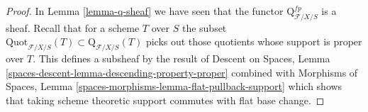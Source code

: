 \documentclass{stacks-project}
\theoremstyle{plain}
\theoremstyle{definition}
\theoremstyle{remark}
\numberwithin{equation}{subsection}
\def\Quotfunctor{\mathrm{Quot}}
\begin{document}
\begin{proof}
In Lemma \ref{lemma-q-sheaf} we have seen that the functor
$\text{Q}^{fp}_{\mathcal{F}/X/S}$ is a sheaf. Recall that for a
scheme $T$ over $S$ the subset
$\Quotfunctor_{\mathcal{F}/X/S}(T) \subset \text{Q}_{\mathcal{F}/X/S}(T)$
picks out those quotients whose support is proper over $T$.
This defines a subsheaf by the result of
Descent on Spaces, Lemma \ref{spaces-descent-lemma-descending-property-proper}
combined with
Morphisms of Spaces, Lemma \ref{spaces-morphisms-lemma-flat-pullback-support}
which shows that taking scheme theoretic support commutes
with flat base change.
\end{proof}
\end{document}
